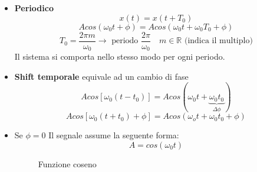 \documentclass[a4paper]{article}
\begin{document}
\begin{itemize}
  \item \textbf{Periodico}
    \[
      x(t) = x(t + T_0)
    \] 
    \[
      A cos(\omega_0 t + \phi) = A cos(\omega_0 t + \omega_0 T_0 + \phi)
    \] 
    \[
      T_0 = \frac{2 \pi m}{\omega_0} \to \text{ periodo } \frac{2\pi}{\omega_0} \quad m \in \mathbb{R} \text{ (indica il multiplo)}
    \] 
    Il sistema si comporta nello stesso modo per ogni periodo.

  \item \textbf{Shift temporale} equivale ad un cambio di fase
    \[
      A cos[\omega_0 (t - t_0)] = A cos(\omega_0t + \underbrace{\omega_0t_0}_{\Delta \phi})
    \] 
    \[
      A cos[\omega_0 (t+t_0) + \phi] = A cos(\omega_o t + \omega_0 t_0 + \phi)
    \] 

  \item Se \( \phi = 0 \) Il segnale assume la seguente forma:
    \[
    A = cos(\omega_0 t)
    \] 
    \begin{figure}[H]
      \centering
      \caption{Funzione coseno}
    \end{figure}


\end{itemize}
\end{document}
